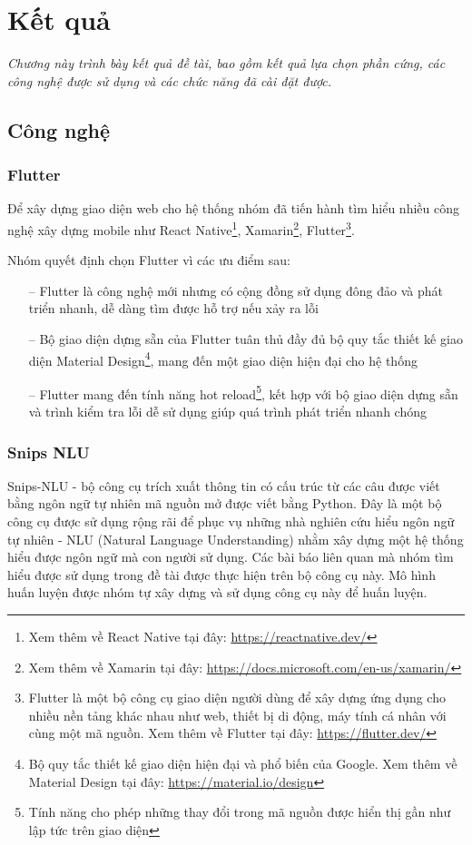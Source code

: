 \chapter{Kết quả}
\label{Chapter5}

\emph{Chương này trình bày kết quả đề tài, bao gồm kết quả lựa chọn phần cứng, các công nghệ được sử dụng và các chức năng đã cài đặt được.}

\section{Công nghệ}

\subsection{Flutter}
Để xây dựng giao diện web cho hệ thống nhóm đã tiến hành tìm hiểu nhiều công nghệ xây dựng mobile như React Native\footnote{Xem thêm về React Native tại đây: \url{https://reactnative.dev/}}, Xamarin\footnote{Xem thêm về Xamarin tại đây: \url{https://docs.microsoft.com/en-us/xamarin/}}, Flutter\footnote{Flutter là một bộ công cụ giao diện người dùng để xây dựng ứng dụng cho nhiều nền tảng khác nhau như web, thiết bị di động, máy tính cá nhân với cùng một mã nguồn. Xem thêm về Flutter tại đây: \url{https://flutter.dev/}}.

Nhóm quyết định chọn Flutter vì các ưu điểm sau:
\begin{itemize}
    \item[--] Flutter là công nghệ mới nhưng có cộng đồng sử dụng đông đảo và phát triển nhanh, dễ dàng tìm được hỗ trợ nếu xảy ra lỗi
    \item[--] Bộ giao diện dựng sẵn của Flutter tuân thủ đầy đủ bộ quy tắc thiết kế giao diện Material Design\footnote{Bộ quy tắc thiết kế giao diện hiện đại và phổ biến của Google. Xem thêm về Material Design tại đây: \url{https://material.io/design}}, mang đến một giao diện hiện đại cho hệ thống
    \item[--] Flutter mang đến tính năng hot reload\footnote{Tính năng cho phép những thay đổi trong mã nguồn được hiển thị gần như lập tức trên giao diện}, kết hợp với bộ giao diện dựng sẵn và trình kiểm tra lỗi dễ sử dụng giúp quá trình phát triển nhanh chóng
\end{itemize}

\subsection{Snips NLU}
Snips-NLU - bộ công cụ trích xuất thông tin có cấu trúc từ các câu được viết bằng ngôn ngữ tự nhiên mã nguồn mở được viết bằng Python.
Đây là một bộ công cụ được sử dụng rộng rãi để phục vụ những nhà nghiên cứu hiểu ngôn ngữ tự nhiên - NLU (Natural Language Understanding) nhằm xây dựng một hệ thống hiểu được ngôn ngữ mà con người sử dụng. Các bài báo liên quan mà nhóm tìm hiểu được sử dụng trong đề tài được thực hiện trên bộ công cụ này. Mô hình huấn luyện được nhóm tự xây dựng và sử dụng công cụ này để huấn luyện.

